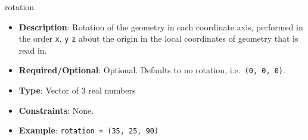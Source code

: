 rotation
\vspace{\the\parameterListSpacing}
\begin{itemize}
    \item {\bf Description}: Rotation of the geometry in each coordinate axis, performed in the order \lstinline!x!, \lstinline!y! \lstinline!z! about the origin in the local coordinates of geometry that is read in.
    \item {\bf Required/Optional}: Optional. Defaults to no rotation, i.e.\ \lstinline!(0, 0, 0)!.
    \item {\bf Type}: Vector of 3 real numbers
    \item {\bf Constraints}: None.
    \item {\bf Example}: \lstinline!rotation = (35, 25, 90)!
\end{itemize}